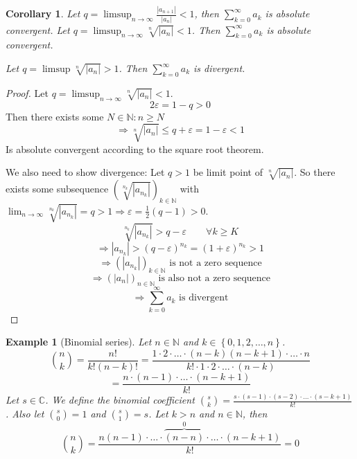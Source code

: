 \documentclass[a4paper,landscape,twocolumn]{article}
\newtheorem{ex}{Example}
\newtheorem{cor}{Corollary}
\newcommand\set[1]{\left\{#1\right\}}
\newcommand\abs[1]{\left|#1\right|}
\newcommand\seq[1]{{\left(#1\right)}_{n \in \mathbb N}}
\begin{document}
\begin{cor}
  Let $q = \limsup_{n\to\infty} \frac{\abs{a_{n+1}}}{\abs{a_n}} < 1$, then
  $\sum_{k=0}^\infty a_k$ is absolute convergent.
  Let $q = \limsup_{n\to\infty} \sqrt[n]{\abs{a_n}} < 1$.
  Then $\sum_{k=0}^\infty a_k$ is absolute convergent.

  Let $q = \limsup{\sqrt[n]{\abs{a_n}}} > 1$. Then $\sum_{k=0}^\infty a_k$ is divergent.
\end{cor}
\begin{proof}
  Let $q = \limsup_{n\to\infty} \sqrt[n]{\abs{a_n}} < 1$.
  \[ 2 \varepsilon = 1 - q > 0 \]
  Then there exists some $N \in \mathbb N: n \geq N$
  \[ \Rightarrow \sqrt[n]{\abs{a_n}} \leq q + \varepsilon = 1 - \varepsilon < 1 \]
  Is absolute convergent according to the square root theorem.

  We also need to show divergence: Let $q > 1$ be limit point of $\sqrt[n]{\abs{a_n}}$.
  So there exists some subsequence $\left(\sqrt[n_k]{\abs{a_{n_k}}}\right)_{k \in \mathbb N}$
  with $\lim_{n\to\infty} \sqrt[n_k]{\abs{a_{n_k}}} = q > 1 \Rightarrow \varepsilon = \frac12 \left(q - 1\right)
  > 0$.
  \[ \sqrt[n_k]{\abs{a_{n_k}}} > q - \varepsilon \qquad \forall k \geq K \]
  \[ \Rightarrow \abs{a_{n_k}} > (q - \varepsilon)^{n_k} = (1 + \varepsilon)^{n_k} > 1 \]
  \[ \Rightarrow \left(\abs{a_{n_k}}\right)_{k\in\mathbb N} \text{ is not a zero sequence} \]
  \[ \Rightarrow \seq{\abs{a_n}} \text{ is also not a zero sequence} \]
  \[ \Rightarrow \sum_{k=0}^\infty a_k \text{ is divergent} \]
\end{proof}

\begin{ex}[Binomial series]
  Let $n \in \mathbb N$ and $k \in \set{0,1,2,\dots,n}$.
  \[
    {n \choose k}
    = \frac{n!}{k! (n-k)!}
    = \frac{1 \cdot 2 \cdot \ldots \cdot (n-k)(n-k+1) \cdot \dots \cdot n}{k! \cdot 1 \cdot 2 \cdot \ldots \cdot (n-k)}
  \] \[
    = \frac{n \cdot (n-1) \cdot \ldots \cdot (n-k+1)}{k!}
  \]
  Let $s \in \mathbb C$. We define the binomial coefficient ${s \choose k}
  = \frac{s \cdot (s-1) \cdot (s-2) \cdot \ldots \cdot (s-k+1)}{k!}$.
  Also let ${s \choose 0} = 1$ and ${s \choose 1} = s$.
  Let $k > n$ and $n \in \mathbb N$, then
  \[ {n \choose k} = \frac{n (n-1) \cdot \ldots \cdot \overbrace{(n-n)}^{0} \cdot \ldots \cdot (n-k+1)}{k!} = 0 \]
\end{ex}
\end{document}
